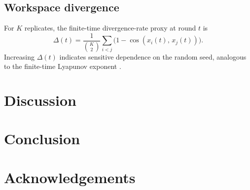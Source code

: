 \documentclass{article}
\begin{document}
\subsection{Workspace divergence}

For $K$ replicates, the finite-time divergence-rate proxy at round $t$ is
\begin{equation}
  \Delta(t) = \frac{1}{\binom{K}{2}}
              \sum_{i < j} \bigl(1 - \cos(x_i(t),\, x_j(t))\bigr).
  \label{eq:divergence}
\end{equation}
Increasing $\Delta(t)$ indicates sensitive dependence on the random seed,
analogous to the finite-time Lyapunov exponent \citep{strogatz2015nonlinear}.


\section{Discussion}


\section{Conclusion}


\section*{Acknowledgements}



\end{document}
